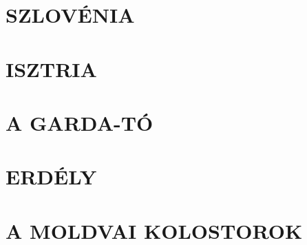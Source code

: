 \chapter{SZLOVÉNIA}

\chapter{ISZTRIA}

\chapter{A GARDA-TÓ}

\chapter{ERDÉLY}

\chapter{A MOLDVAI KOLOSTOROK}
